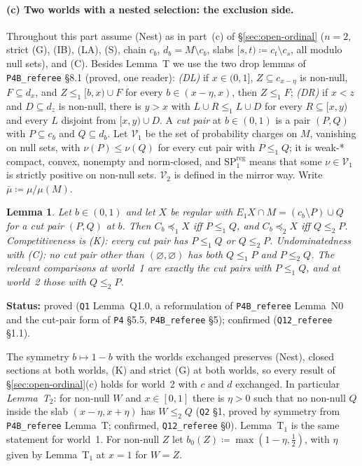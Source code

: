 \documentclass[11pt]{article}
\newtheorem{lemma}[theorem]{Lemma}
\theoremstyle{definition}
\theoremstyle{remark}
\newcommand{\src}[1]{\texttt{#1}}
\newcommand{\status}[1]{\par\smallskip\noindent\textbf{Status:} #1\par\smallskip}
\begin{document}
\paragraph{(c) Two worlds with a nested selection: the exclusion side.} Throughout this part assume (Nest) as in part~(c) of \S\ref{sec:open-ordinal} ($n=2$, strict (G), (IB), (LA), (S), chain $c_b$, $d_b=M\setminus c_b$, slabs $[s,t)\coloneqq c_t\setminus c_s$, all modulo null sets), and (C). Besides Lemma~T we use the two drop lemmas of \src{P4B\_referee} \S8.1 (proved, one reader): \emph{(DL)} if $x\in(0,1]$, $Z\subseteq c_{x-\eta}$ is non-null, $F\subseteq d_x$, and $Z\le_1[b,x)\cup F$ for every $b\in(x-\eta,x)$, then $Z\le_1F$; \emph{(DR)} if $x<z$ and $D\subseteq d_z$ is non-null, there is $y>x$ with $L\cup R\le_1L\cup D$ for every $R\subseteq[x,y)$ and every $L$ disjoint from $[x,y)\cup D$. A \emph{cut pair} at $b\in(0,1)$ is a pair $(P,Q)$ with $P\subseteq c_b$ and $Q\subseteq d_b$. Let $\mathcal V_1$ be the set of probability charges on $M$, vanishing on null sets, with $\nu(P)\le\nu(Q)$ for every cut pair with $P\le_1Q$; it is weak-* compact, convex, nonempty and norm-closed, and SP$^{\mathrm{reg}}_1$ means that some $\nu\in\mathcal V_1$ is strictly positive on non-null sets. $\mathcal V_2$ is defined in the mirror way. Write $\bar\mu\coloneqq\mu/\mu(M)$.

\begin{lemma}\label{lem:cutform}
Let $b\in(0,1)$ and let $X$ be regular with $E_1X\cap M=(c_b\setminus P)\cup Q$ for a cut pair $(P,Q)$ at $b$. Then $C_b\preceq_1X$ iff $P\le_1Q$, and $C_b\preceq_2X$ iff $Q\le_2P$. Competitiveness is (K): every cut pair has $P\le_1Q$ or $Q\le_2P$. Undominatedness with (C): no cut pair other than $(\varnothing,\varnothing)$ has both $Q\le_1P$ and $P\le_2Q$. The relevant comparisons at world~1 are exactly the cut pairs with $P\le_1Q$, and at world~2 those with $Q\le_2P$.
\end{lemma}
\status{proved (\src{Q1} Lemma~Q1.0, a reformulation of \src{P4B\_referee} Lemma~N0 and the cut-pair form of \src{P4} \S5.5, \src{P4B\_referee} \S5); confirmed (\src{Q12\_referee} \S1.1).}

The symmetry $b\mapsto1-b$ with the worlds exchanged preserves (Nest), closed sections at both worlds, (K) and strict (G) at both worlds, so every result of \S\ref{sec:open-ordinal}(c) holds for world~2 with $c$ and $d$ exchanged. In particular \emph{Lemma~T$_2$}: for non-null $W$ and $x\in[0,1]$ there is $\eta>0$ such that no non-null $Q$ inside the slab $(x-\eta,x+\eta)$ has $W\le_2Q$ (\src{Q2} \S1, proved by symmetry from \src{P4B\_referee} Lemma~T; confirmed, \src{Q12\_referee} \S0). Lemma~T$_1$ is the same statement for world~1. For non-null $Z$ let $b_0(Z)\coloneqq\max(1-\eta,\tfrac12)$, with $\eta$ given by Lemma~T$_1$ at $x=1$ for $W=Z$.
\end{document}
